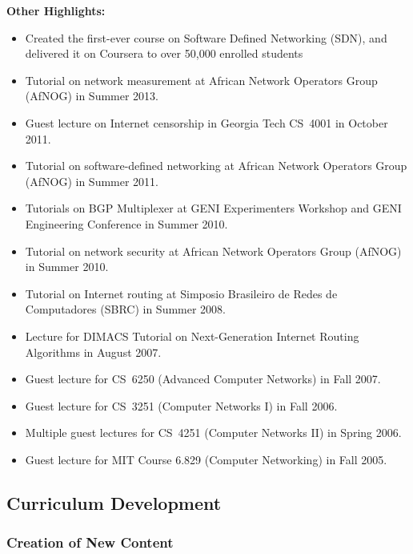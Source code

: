 \noindent
{\bf Other Highlights:}
\begin{itemize}
\itemsep=-1pt
\item Created the first-ever course on Software Defined Networking (SDN), and
delivered it on Coursera to over 50,000 enrolled students 
\item Tutorial on network measurement at African Network Operators Group
(AfNOG) in Summer 2013. 
\item Guest lecture on Internet censorship in Georgia Tech CS~4001 in October
2011. 
\item Tutorial on software-defined networking at African Network Operators
Group (AfNOG) in Summer 2011. 
\item Tutorials on BGP Multiplexer at GENI Experimenters Workshop and
  GENI Engineering Conference in Summer 2010. 
\item Tutorial on network security at African Network Operators Group (AfNOG)
in Summer 2010.
\item Tutorial on Internet routing at Simposio Brasileiro de Redes de Computadores (SBRC) in Summer 2008. 
\item Lecture for DIMACS Tutorial on Next-Generation Internet Routing
  Algorithms in August 2007. 
\item Guest lecture for CS~6250 (Advanced Computer Networks) in Fall 2007. 
\item Guest lecture for CS~3251 (Computer Networks I) in Fall 2006. 
\item Multiple guest lectures for CS~4251 (Computer Networks II) in Spring
2006.
\item Guest lecture for MIT Course 6.829 (Computer Networking) in Fall
  2005. 
\end{itemize}


\subsection{Curriculum Development}
\label{subsec:curriculum}

\subsubsection{Creation of New Content}

